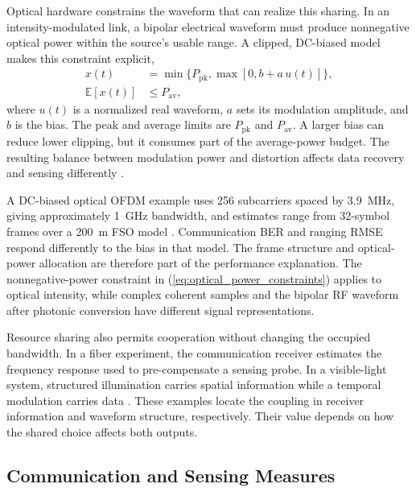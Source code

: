 Optical hardware constrains the waveform that can realize this sharing.
In an intensity-modulated link, a bipolar electrical waveform must produce
nonnegative optical power within the source's usable range. A clipped,
DC-biased model makes this constraint explicit,
\begin{equation}
\begin{aligned}
x(t)&=\min\{P_{\mathrm{pk}},\max[0,b+a\,u(t)]\},\\
\mathbb{E}[x(t)]&\leq P_{\mathrm{av}},
\end{aligned}
\label{eq:optical_power_constraints}
\end{equation}
where $u(t)$ is a normalized real waveform, $a$ sets its modulation amplitude,
and $b$ is the bias. The peak and average limits are $P_{\mathrm{pk}}$ and
$P_{\mathrm{av}}$. A larger bias can reduce lower clipping, but it consumes
part of the average-power budget. The resulting balance between modulation
power and distortion affects data recovery and sensing differently
\cite{Wen2024OISACArchitectures}.

A DC-biased optical OFDM example uses 256 subcarriers spaced by 3.9~MHz,
giving approximately 1~GHz bandwidth, and estimates range from 32-symbol
frames over a 200~m FSO model \cite{Wen2024OISACArchitectures}. Communication
BER and ranging RMSE respond differently to the bias in that model.
The frame structure and optical-power allocation are therefore part of the
performance explanation. The nonnegative-power constraint in
(\ref{eq:optical_power_constraints}) applies to optical intensity, while
complex coherent samples and the bipolar RF waveform after photonic
conversion have different signal representations.

Resource sharing also permits cooperation without changing the occupied
bandwidth. In a fiber experiment, the communication receiver estimates the
frequency response used to pre-compensate a sensing probe. In a visible-light
system, structured illumination carries spatial information while a temporal
modulation carries data
\cite{OISAC_SCR00057,OISAC_SCR00196}. These examples locate the coupling in
receiver information and waveform structure, respectively. Their value
depends on how the shared choice affects both outputs.

\subsection{Communication and Sensing Measures}
\label{sec:communication_sensing_measures}

